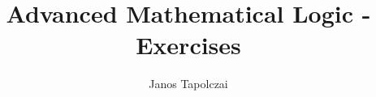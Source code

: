 \documentclass[]{scrartcl}
\title{Advanced Mathematical Logic - Exercises}
\author{Janos Tapolczai}
\begin{document}
\maketitle

\begin{abstract}

\end{abstract}

%
%
%
%
%
%
%
%
%
%
%
%
%
%
%
%
%




\end{document}
